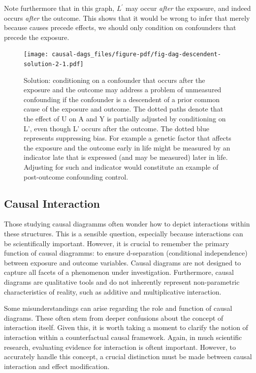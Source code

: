 \documentclass[
  singlecolumn]{report}
\begin{document}
Note furthermore that in this graph, \(L^\prime\) may occur \emph{after}
the exposure, and indeed occurs \emph{after} the outcome. This shows
that it would be wrong to infer that merely because causes precede
effects, we should only condition on confounders that precede the
exposure.

\begin{figure}

{\centering \texttt{[image: causal-dags\_files/figure-pdf/fig-dag-descendent-solution-2-1.pdf]}

}

\caption{\label{fig-dag-descendent-solution-2}Solution: conditioning on
a confounder that occurs after the exposure and the outcome may address
a problem of unmeasured confounding if the confounder is a descendent of
a prior common cause of the exposure and outcome. The dotted paths
denote that the effect of U on A and Y is partially adjusted by
conditioning on L', even though L' occurs after the outcome. The dotted
blue represents suppressing bias. For example a genetic factor that
affects the exposure and the outcome early in life might be measured by
an indicator late that is expressed (and may be measured) later in life.
Adjusting for such and indicator would constitute an example of
post-outcome confounding control.}

\end{figure}

\hypertarget{causal-interaction}{%
\subsection{Causal Interaction}\label{causal-interaction}}

Those studying causal diagramms often wonder how to depict interactions
within these structures. This is a sensible question, especially because
interactions can be scientifically important. However, it is crucial to
remember the primary function of causal diagramms: to ensure
d-separation (conditional independence) between exposure and outcome
variables. Causal diagrams are not designed to capture all facets of a
phenomenon under investigation. Furthermore, causal diagrams are
qualitative tools and do not inherently represent non-parametric
characteristics of reality, such as additive and multiplicative
interaction.

Some misunderstandings can arise regarding the role and function of
causal diagrams. These often stem from deeper confusions about the
concept of interaction itself. Given this, it is worth taking a moment
to clarify the notion of interaction within a counterfactual causal
framework. Again, in much scientific research, evaluating evidence for
interaction is oftent important. However, to accurately handle this
concept, a crucial distinction must be made between causal interaction
and effect modification.
\end{document}
